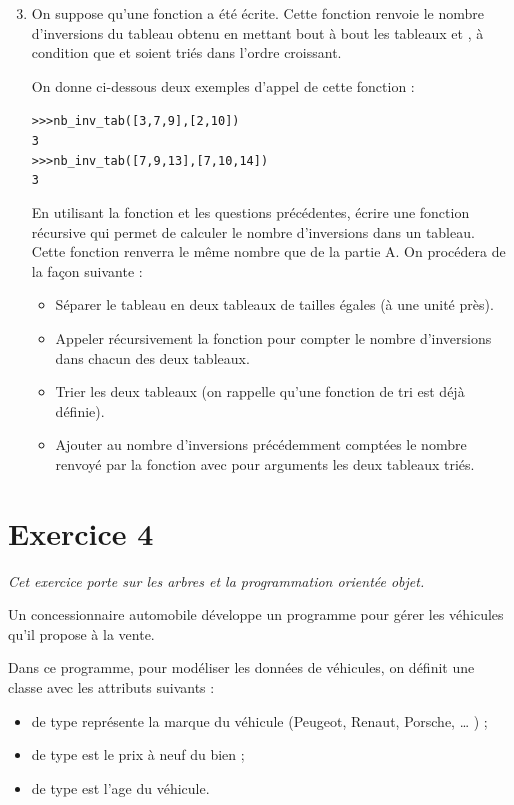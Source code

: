 \documentclass[11pt,a4paper,french,twoside]{PMCours}
\begin{document}
\begin{enumerate}\setcounter{enumi}{2}
\item On suppose qu'une fonction  a été écrite. Cette fonction
renvoie le nombre d'inversions du tableau obtenu en mettant bout à bout les tableaux
 et , à condition que  et  soient triés dans l'ordre croissant.

On donne ci-dessous deux exemples d'appel de cette fonction :
\begin{alltt}
>>> nb\_inv\_tab([3, 7, 9], [2, 10])
3
>>> nb\_inv\_tab([7, 9, 13], [7, 10, 14])
3
\end{alltt}
En utilisant la fonction  et les questions précédentes, écrire une fonction
récursive  qui permet de calculer le nombre d'inversions
dans un tableau. Cette fonction renverra le même nombre que
 de la partie A. On procédera de la façon suivante :
\begin{itemize}
\item Séparer le tableau en deux tableaux de tailles égales (à une unité près).
\item Appeler récursivement la fonction  pour compter le nombre
d'inversions dans chacun des deux tableaux.
\item Trier les deux tableaux (on rappelle qu'une fonction de tri est déjà définie).
\item Ajouter au nombre d'inversions précédemment comptées le nombre renvoyé par la
fonction  avec pour arguments les deux tableaux triés.
\end{itemize}
\end{enumerate}

\newpage
\section*{Exercice 4}

\emph{Cet exercice porte sur les arbres et la programmation orientée objet.}

\medskip
Un concessionnaire automobile développe un programme pour gérer les véhicules qu'il
propose à la vente.

Dans ce programme, pour modéliser les données de véhicules, on définit une classe
 avec les attributs suivants :
\begin{itemize}
\item {} de type  représente la marque du véhicule (Peugeot, Renaut, Porsche, … ) ;
\item {} de type  est le prix à neuf du bien ;
\item {} de type  est l'age du véhicule.
\end{itemize}
\end{document}
